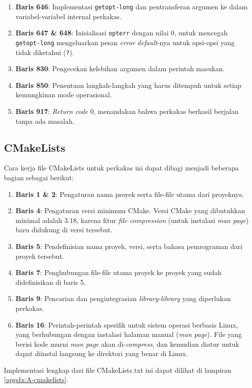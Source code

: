 \begin{enumerate}
	\item \textbf{Baris 646}: Implementasi \verb|getopt-long| dan pentransferan argumen ke dalam variabel-variabel internal perkakas.
	\item \textbf{Baris 647 \& 648}: Inisialisasi \verb|opterr| dengan nilai 0, untuk mencegah \verb|getopt-long| mengeluarkan pesan \textit{error default}-nya untuk opsi-opsi yang tidak diketahui (\textquotesingle\verb|?|\textquotesingle). 
	\item \textbf{Baris 830}: Pengecekan kelebihan argumen dalam perintah masukan.
	\item \textbf{Baris 850}: Penentuan langkah-langkah yang harus ditempuh untuk setiap kemungkinan mode operasional.
	\item \textbf{Baris 917}: \textit{Return code} 0, menandakan bahwa perkakas berhasil berjalan tanpa ada masalah.
\end{enumerate}

\subsection{CMakeLists}
\label{sec:testing-implementation-cmakelists}

Cara kerja file CMakeLists untuk perkakas ini dapat dibagi menjadi beberapa bagian sebagai berikut:

\begin{enumerate}
	\item \textbf{Baris 1 \& 2}: Pengaturan nama proyek serta file-file utama dari proyeknya.
	\item \textbf{Baris 4}: Pengaturan versi minimum CMake. Versi CMake yang dibutuhkan minimal adalah 3.18, karena fitur \textit{file compression} (untuk instalasi \textit{man page}) baru didukung di versi tersebut.
	\item \textbf{Baris 5}: Pendefinisian nama proyek, versi, serta bahasa pemrograman dari proyek tersebut.
	\item \textbf{Baris 7}: Penghubungan file-file utama proyek ke proyek yang sudah didefinisikan di baris 5.
	\item \textbf{Baris 9}: Pencarian dan pengintegrasian \textit{library-library} yang diperlukan perkakas.
	\item \textbf{Baris 16}: Perintah-perintah spesifik untuk sistem operasi berbasis Linux, yang berhubungan dengan instalasi halaman manual (\textit{man page}). File yang berisi kode murni \textit{man page} akan di-\textit{compress}, dan kemudian diatur untuk dapat diinstal langsung ke direktori yang benar di Linux.
\end{enumerate}
\noindent
Implementasi lengkap dari file CMakeLists.txt ini dapat dilihat di lampiran \ref{appdx:A-cmakelists}.

